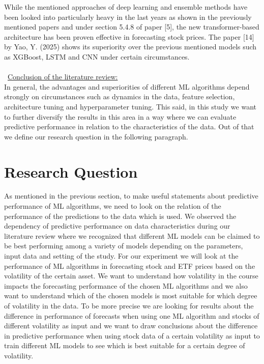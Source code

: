 \documentclass[a4paper,12pt]{report}
\begin{document}
While the mentioned approaches of deep learning and ensemble methods have been looked into particularly heavy in the last years as shown in the previously mentioned papers and under section 5.4.8 of paper [5], the new transformer-based architecture has been proven effective in forecasting stock prices. The paper [14] by Yao, Y. (2025) shows its superiority over the previous mentioned models such as XGBoost, LSTM and CNN under certain circumstances. \\
\\\
\underline{Conclusion of the literature review:} \\
In general, the advantages and superiorities of different ML algorithms depend strongly on circumstances such as dynamics in the data, feature selection, architecture tuning and hyperparameter tuning. This said, in this study we want to further diversify the results in this area in a way where we can evaluate predictive performance in relation to the characteristics of the data. Out of that we define our research question in the following paragraph.

\chapter{Research Question}
As mentioned in the previous section, to make useful statements about predictive performance of ML algorithms, we need to look on the relation of the performance of the predictions to the data which is used. We observed the dependency of predictive performance on data characteristics during our literature review where we recognized that different ML models can be claimed to be best performing among a variety of models depending on the parameters, input data and setting of the study. For our experiment we will look at the performance of ML algorithms in forecasting stock and ETF prices based on the volatility of the certain asset. We want to understand how volatility in the course impacts the forecasting performance of the chosen ML algorithms and we also want to understand which of the chosen models is most suitable for which degree of volatility in the data. To be more precise we are looking for results about the difference in performance of forecasts when using one ML algorithm and stocks of different volatility as input and we want to draw conclusions about the difference in predictive performance when using stock data of a certain volatility as input to train different ML models to see which is best suitable for a certain degree of volatility.
\end{document}

